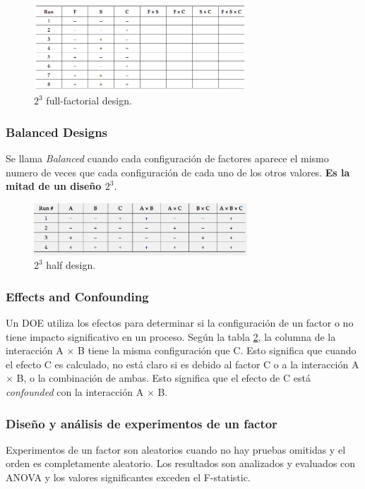 \documentclass[]{article}
\begin{document}
\begin{figure}[H]
	\centering
	\includegraphics[width=80mm]{imagenes/a23design.png}
	\caption{$2^3$ full-factorial design.}
	\label{fig:A23design}
\end{figure}

\subsubsection{Balanced Designs}
Se llama \textit{Balanced} cuando cada configuración de factores aparece el mismo numero de veces que cada configuración de cada uno de los otros valores. \textbf{Es la mitad de un diseño $2^3$}.

\begin{figure}[H]
	\centering
	\includegraphics[width=80mm]{imagenes/a23halfdesign.png}
	\caption{$2^3$ half design.}
	\label{fig:a23halfdesign}
\end{figure}

\subsubsection{Effects and Confounding}

Un DOE utiliza los efectos para determinar si la configuración de un factor o no tiene impacto significativo en un proceso. 
Según la tabla \ref{fig:a23halfdesign}, la columna de la interacción A $\times$ B tiene la misma configuración que C. Esto significa que cuando el efecto C es calculado, no está claro si es debido al factor C o a la interacción A $\times$ B, o la combinación de ambas. Esto significa que el efecto de C está \textit{confounded} con la interacción A $\times$ B.

\subsubsection{Diseño y análisis de experimentos de un factor}
Experimentos de un factor son aleatorios cuando no hay pruebas omitidas y el orden es completamente aleatorio. Los resultados son analizados y evaluados con ANOVA y los valores significantes exceden el F-statistic.
\end{document}
